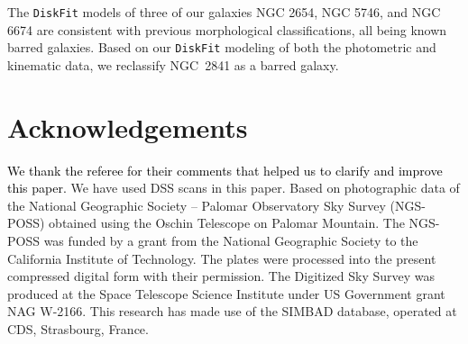 \documentclass[a4paper,fleqn,usenatbib]{mnras}
\newcommand{\authorfix}{\textcolor{black}}
\begin{document}
The \texttt{DiskFit} models of three of our galaxies NGC 2654, NGC 5746, and NGC 6674 are consistent with previous morphological classifications, all being known barred galaxies. Based on our \texttt{DiskFit} modeling of both the photometric and kinematic data, we reclassify NGC~2841 as a barred galaxy. 

\section*{Acknowledgements}

\authorfix{We thank the referee for their comments that helped us to clarify and improve this paper.} We have used DSS scans in this paper. Based on photographic data of the National Geographic Society -- Palomar Observatory Sky Survey (NGS-POSS) obtained using the Oschin Telescope on Palomar Mountain. The NGS-POSS was funded by a grant from the National Geographic Society to the California Institute of Technology. The plates were processed into the present compressed digital form with their permission. The Digitized Sky Survey was produced at the Space Telescope Science Institute under US Government grant NAG W-2166.  This research has made use of the SIMBAD database, operated at CDS, Strasbourg, France.
\end{document}
